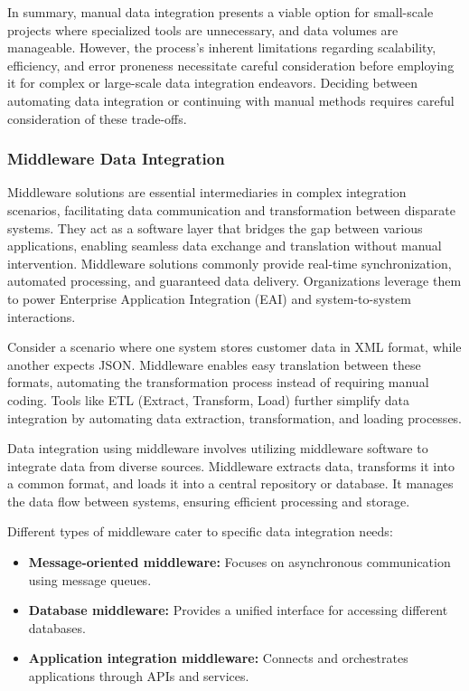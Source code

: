 \documentclass[12pt]{book}
\begin{document}
In summary, manual data integration presents a viable option for small-scale projects where specialized tools are unnecessary, and data volumes are manageable.  However, the process's inherent limitations regarding scalability, efficiency, and error proneness necessitate careful consideration before employing it for complex or large-scale data integration endeavors. Deciding between automating data integration or continuing with manual methods requires careful consideration of these trade-offs.

\subsubsection{Middleware Data Integration}

Middleware solutions are essential intermediaries in complex integration scenarios, facilitating data communication and transformation between disparate systems. They act as a software layer that bridges the gap between various applications, enabling seamless data exchange and translation without manual intervention. Middleware solutions commonly provide real-time synchronization, automated processing, and guaranteed data delivery. Organizations leverage them to power Enterprise Application Integration (EAI) and system-to-system interactions.

Consider a scenario where one system stores customer data in XML format, while another expects JSON. Middleware enables easy translation between these formats, automating the transformation process instead of requiring manual coding. Tools like ETL (Extract, Transform, Load) further simplify data integration by automating data extraction, transformation, and loading processes.

Data integration using middleware involves utilizing middleware software to integrate data from diverse sources. Middleware extracts data, transforms it into a common format, and loads it into a central repository or database. It manages the data flow between systems, ensuring efficient processing and storage.

Different types of middleware cater to specific data integration needs:

\begin{itemize}
    \item \textbf{Message-oriented middleware:} Focuses on asynchronous communication using message queues.
    \item \textbf{Database middleware:} Provides a unified interface for accessing different databases.
    \item \textbf{Application integration middleware:} Connects and orchestrates applications through APIs and services.
\end{itemize}
\end{document}
